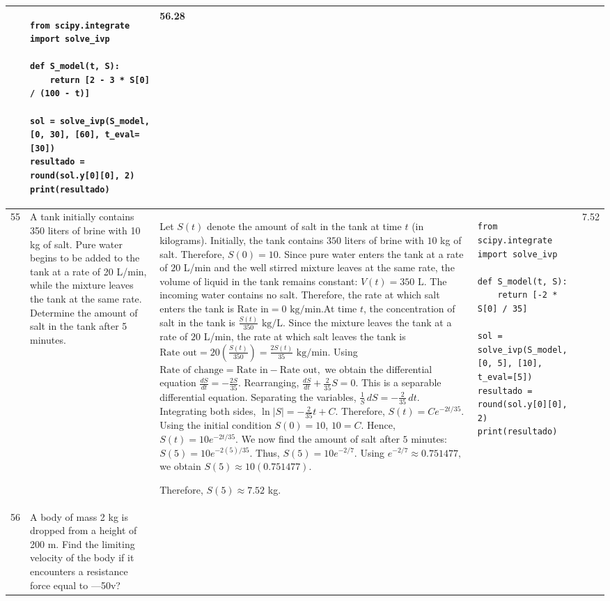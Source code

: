\documentclass[a4paper,12pt]{article}
\begin{document}
\begin{longtable}{|p{0.3cm}|p{}|p{10cm}|p{}|p{1.5cm}|}
 &\begin{verbatim}
from scipy.integrate import solve_ivp

def S_model(t, S):
    return [2 - 3 * S[0] / (100 - t)]

sol = solve_ivp(S_model, [0, 30], [60], t_eval=[30])
resultado = round(sol.y[0][0], 2)
print(resultado)
\end{verbatim}& 56.28 \\ \hline 
 55           & A tank initially contains 350 liters of brine with 10 kg of salt. Pure water begins to be added to the tank at a rate of 20 L/min, while the mixture leaves the tank at the same rate. Determine the amount of salt in the tank after 5 minutes.


              &Let $S(t)$ denote the amount of salt in the tank at time $t$ (in kilograms).
Initially, the tank contains $350$ liters of brine with $10$ kg of salt. Therefore,
$S(0)=10.$
Since pure water enters the tank at a rate of $20$ L/min and the well stirred mixture leaves at the same rate, the volume of liquid in the tank remains constant:
$V(t)=350\text{ L}.$
The incoming water contains no salt. Therefore, the rate at which salt enters the tank is
$\text{Rate in}=0\text{ kg/min}.$At time $t$, the concentration of salt in the tank is
$\frac{S(t)}{350}\text{ kg/L}.$
Since the mixture leaves the tank at a rate of $20$ L/min, the rate at which salt leaves the tank is $\text{Rate out}=20\left(\frac{S(t)}{350}\right)
=\frac{2S(t)}{35}\text{ kg/min}.$ Using $\text{Rate of change}=\text{Rate in}-\text{Rate out},$
we obtain the differential equation $\frac{dS}{dt}=-\frac{2S}{35}.$
Rearranging, $\frac{dS}{dt}+\frac{2}{35}S=0.$
This is a separable differential equation. Separating the variables,
$\frac{1}{S}\,dS=-\frac{2}{35}\,dt.$
Integrating both sides, $\ln|S|=-\frac{2}{35}t+C.$
Therefore, $S(t)=Ce^{-2t/35}.$
Using the initial condition $S(0)=10$, $10=C.$  Hence, $S(t)=10e^{-2t/35}.$
We now find the amount of salt after $5$ minutes: $S(5)=10e^{-2(5)/35}.$
Thus, $S(5)=10e^{-2/7}.$ Using $e^{-2/7}\approx0.751477,$ we obtain $S(5)\approx10(0.751477).$

Therefore, $S(5)\approx7.52$ kg.

&\begin{verbatim}
from scipy.integrate import solve_ivp

def S_model(t, S):
    return [-2 * S[0] / 35]

sol = solve_ivp(S_model, [0, 5], [10], t_eval=[5])
resultado = round(sol.y[0][0], 2)
print(resultado)
\end{verbatim} &  7.52\\ \hline 
 56           & A body of mass 2 kg is dropped from a height of 200 m. Find the limiting velocity of the body if it encounters a
resistance force equal to —50v?



\end{longtable}
\end{document}
